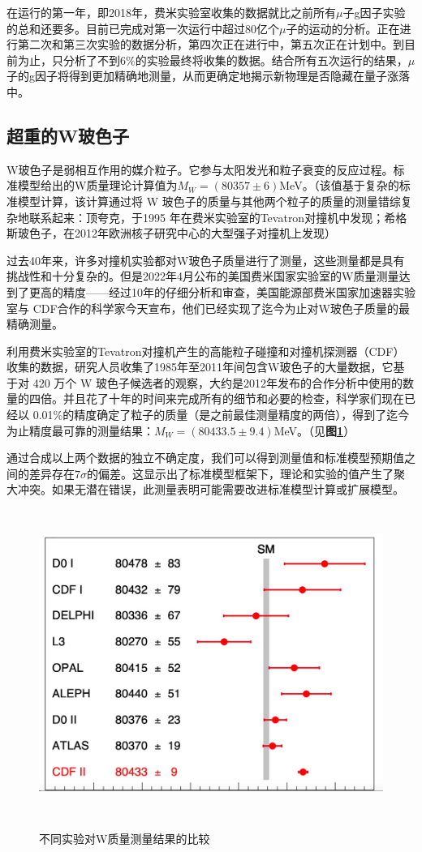 在运行的第一年，即2018年，费米实验室收集的数据就比之前所有$\mu$子g因子实验的总和还要多。目前已完成对第一次运行中超过80亿个$\mu$子的运动的分析。正在进行第二次和第三次实验的数据分析，第四次正在进行中，第五次正在计划中。到目前为止，只分析了不到6\%的实验最终将收集的数据。结合所有五次运行的结果，$\mu$子的g因子将得到更加精确地测量，从而更确定地揭示新物理是否隐藏在量子涨落中。

\subsection{超重的W玻色子}
W玻色子是弱相互作用的媒介粒子。它参与太阳发光和粒子衰变的反应过程。标准模型给出的W质量理论计算值为$M_W=(80357\pm6)$MeV。（该值基于复杂的标准模型计算，该计算通过将 W 玻色子的质量与其他两个粒子的质量的测量错综复杂地联系起来：顶夸克，于1995 年在费米实验室的Tevatron对撞机中发现\cite{top_quark_discovery}；希格斯玻色子，在2012年欧洲核子研究中心的大型强子对撞机上发现\cite{Higgs_discovery}）

过去40年来，许多对撞机实验都对W玻色子质量进行了测量，这些测量都是具有挑战性和十分复杂的。但是2022年4月公布的美国费米国家实验室的W质量测量\cite{Wmass}达到了更高的精度——经过10年的仔细分析和审查，美国能源部费米国家加速器实验室与 CDF合作的科学家今天宣布，他们已经实现了迄今为止对W玻色子质量的最精确测量。

利用费米实验室的Tevatron对撞机产生的高能粒子碰撞和对撞机探测器（CDF）收集的数据，研究人员收集了1985年至2011年间包含W玻色子的大量数据，它基于对 420 万个 W 玻色子候选者的观察，大约是2012年发布的合作分析中使用的数量的四倍。并且花了十年的时间来完成所有的细节和必要的检查，科学家们现在已经以 0.01\%的精度确定了粒子的质量（是之前最佳测量精度的两倍），得到了迄今为止精度最可靠的测量结果：$M_W=(80433.5\pm9.4)$MeV。（见\textbf{图\ref{fig:1.3}}）

通过合成以上两个数据的独立不确定度，我们可以得到测量值和标准模型预期值之间的差异存在$7\sigma$的偏差。这显示出了标准模型框架下，理论和实验的值产生了聚大冲突。如果无潜在错误，此测量表明可能需要改进标准模型计算或扩展模型。

\begin{figure}[H]
 \centering
 \caption{不同实验对W质量测量结果的比较\cite{Wmass_fig}}
 \includegraphics[height=10cm, width=12cm]{pictures/w-boson-comparisons.jpeg}
 \label{fig:1.3}
\end{figure}




